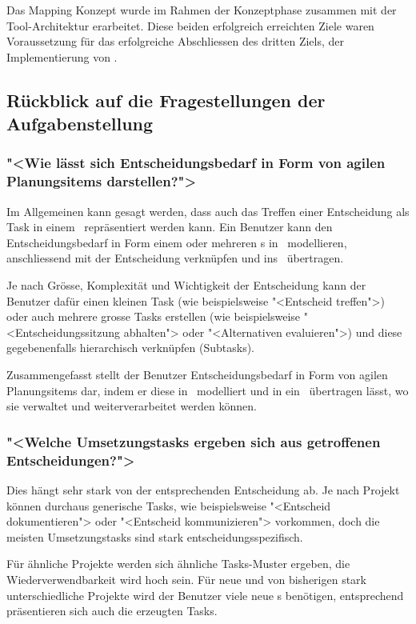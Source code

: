 		Das Mapping Konzept wurde im Rahmen der Konzeptphase zusammen mit der Tool-Architektur erarbeitet. 
		Diese beiden erfolgreich erreichten Ziele waren Voraussetzung für das erfolgreiche Abschliessen des dritten Ziels, 
		der Implementierung von \eeppi.
				
		
	
	\subsection{Rückblick auf die Fragestellungen der Aufgabenstellung}
		\subsubsection{"<Wie lässt sich Entscheidungsbedarf in Form von agilen Planungsitems darstellen?">}
			Im Allgemeinen kann gesagt werden,
			dass auch das Treffen einer Entscheidung als Task in einem \ppt\ repräsentiert werden kann.
			Ein Benutzer kann den Entscheidungsbedarf in Form einem oder mehreren \ttpl s in \eeppi\ modellieren,  
			anschliessend mit der Entscheidung verknüpfen und ins \ppt\ übertragen.
			
			Je nach Grösse, Komplexität und Wichtigkeit der Entscheidung kann der Benutzer dafür einen kleinen Task (wie beispielsweise "<Entscheid treffen">) oder auch mehrere grosse Tasks erstellen (wie beispielsweise "<Entscheidungssitzung abhalten"> oder "<Alternativen evaluieren">) und diese gegebenenfalls hierarchisch verknüpfen (Subtasks).			
			
			Zusammengefasst stellt der Benutzer Entscheidungsbedarf in Form von agilen Planungsitems dar, indem er diese in \eeppi\ modelliert und in ein \ppt\ übertragen lässt, wo sie verwaltet und weiterverarbeitet werden können.


		\subsubsection{"<Welche Umsetzungstasks ergeben sich aus getroffenen Entscheidungen?">}
			Dies hängt sehr stark von der entsprechenden Entscheidung ab.
			Je nach Projekt können durchaus generische Tasks, wie beispielsweise "<Entscheid dokumentieren"> oder "<Entscheid kommunizieren"> vorkommen,
			doch die meisten Umsetzungstasks sind stark ent\-schei\-dungs\-spezifisch.
			
			Für ähnliche Projekte werden sich ähnliche Tasks-Muster ergeben, die Wiederverwendbarkeit wird hoch sein.
			Für neue und von bisherigen stark unterschiedliche Projekte wird der Benutzer viele neue \ttpl s benötigen, 
			entsprechend präsentieren sich auch die erzeugten Tasks.
			
